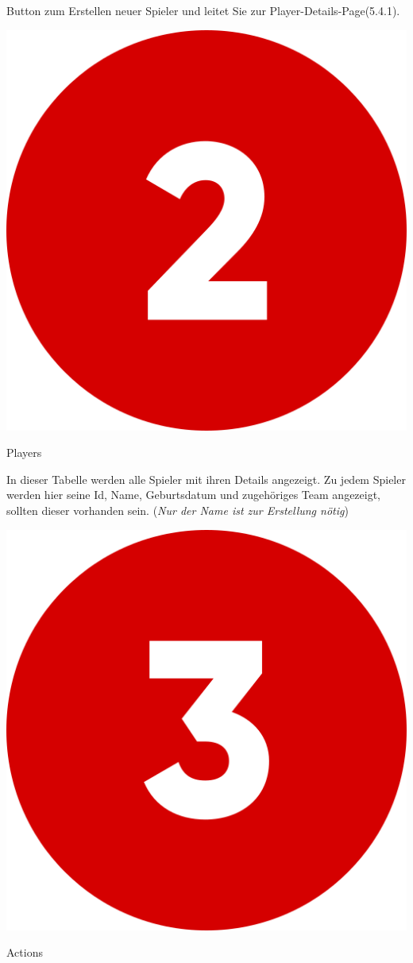 Button zum Erstellen neuer Spieler und leitet Sie zur Player-Details-Page(5.4.1).

\bigskip
\includegraphics[scale=0.05]{pics/user-guide/numbers/number-2.png} \begin{LARGE} Players \end{LARGE}

In dieser Tabelle werden alle Spieler mit ihren Details angezeigt. Zu jedem Spieler werden hier seine Id, Name, Geburtsdatum und zugehöriges Team angezeigt,
sollten dieser vorhanden sein. (\textit{Nur der Name ist zur Erstellung nötig})

\bigskip
\includegraphics[scale=0.05]{pics/user-guide/numbers/number-3.png} \begin{LARGE} Actions \end{LARGE}

